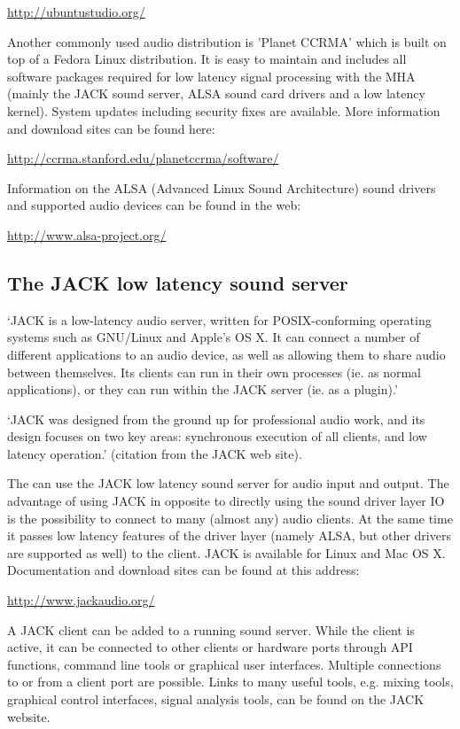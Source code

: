 \url{http://ubuntustudio.org/}

Another commonly used audio distribution is
'Planet CCRMA' which is built on top of a
Fedora Linux distribution.
%
It is easy to maintain and includes all software packages required for
low latency signal processing with the MHA (mainly
the JACK sound server, ALSA sound card drivers
and a low latency kernel).
%
System updates including security fixes are available.
%
More information and download sites can be found here:

\url{http://ccrma.stanford.edu/planetccrma/software/}

Information on the ALSA (Advanced Linux Sound Architecture) sound
drivers and supported audio devices can be found in the web:

\url{http://www.alsa-project.org/}


\subsection{The JACK low latency sound server}
\label{sec:jack}

`JACK is a low-latency audio server, written for POSIX-conforming
operating systems such as GNU/Linux and Apple's OS X. It can connect a
number of different applications to an audio device, as well as
allowing them to share audio between themselves. Its clients can run
in their own processes (ie. as normal applications), or they can run
within the JACK server (ie. as a plugin).'

`JACK was designed from the ground up for professional audio work, and
its design focuses on two key areas: synchronous execution of all
clients, and low latency operation.' (citation from the JACK web site).

The \mhad{} can use the JACK low latency sound
server for audio input and output.
%
The advantage of using JACK in opposite to directly using the sound
driver layer IO is the possibility to connect to many (almost any)
audio clients.
%
At the same time it passes low latency features of the driver layer
(namely ALSA, but other drivers are supported as well) to the client.
%
JACK is available for Linux and Mac OS X. Documentation and download
sites can be found at this address:

\url{http://www.jackaudio.org/}

A JACK client can be added to a running sound server. While the client
is active, it can be connected to other clients or hardware ports
through API functions, command line tools or graphical user
interfaces. Multiple connections to or from a client port are
possible. Links to many useful tools, e.g. mixing
tools, graphical control interfaces, signal analysis tools, can be
found on the JACK website.

